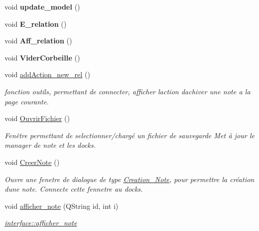 \begin{DoxyCompactItemize}
\item 
\mbox{\label{classinterface_afb97d08561d883c718da0fd638c7f77f}} 
void {\bfseries update\+\_\+model} ()
\item 
\mbox{\label{classinterface_a0f50f64c70556ffcd16c9073d885e5c3}} 
void {\bfseries E\+\_\+relation} ()
\item 
\mbox{\label{classinterface_a8ac5467a589ab5af2e91056edafa7707}} 
void {\bfseries Aff\+\_\+relation} ()
\item 
\mbox{\label{classinterface_a2e950dd5e3f8937e1147f4f3d696fc40}} 
void {\bfseries Vider\+Corbeille} ()
\item 
\mbox{\label{classinterface_afda8f97b198f7d434cb1eb2d845dfefc}} 
void \hyperlink{classinterface_afda8f97b198f7d434cb1eb2d845dfefc}{add\+Action\+\_\+new\+\_\+rel} ()
\begin{DoxyCompactList}\small\item\em fonction outils, permettant de connecter, afficher l\textquotesingle{}action d\textquotesingle{}achiver une note a la page courante. \end{DoxyCompactList}\item 
void \hyperlink{classinterface_af42d8f6426ad19ce13f1dd2ce9f519c1}{Ouvrir\+Fichier} ()
\begin{DoxyCompactList}\small\item\em Fenêtre permettant de selectionner/chargé un fichier de sauvegarde Met à jour le manager de note et les docks. \end{DoxyCompactList}\item 
void \hyperlink{classinterface_a23957135caad59d8850fe8e2cbee28a3}{Creer\+Note} ()
\begin{DoxyCompactList}\small\item\em Ouvre une fenetre de dialogue de type \hyperlink{class_creation___note}{Creation\+\_\+\+Note}, pour permettre la création d\textquotesingle{}une note. Connecte cette fennetre au docks. \end{DoxyCompactList}\item 
void \hyperlink{classinterface_a320051a7a36aa24f53b12df82649f15f}{afficher\+\_\+note} (Q\+String id, int i)
\begin{DoxyCompactList}\small\item\em \hyperlink{classinterface_a320051a7a36aa24f53b12df82649f15f}{interface\+::afficher\+\_\+note} \end{DoxyCompactList}\item 

\end{DoxyCompactItemize}
